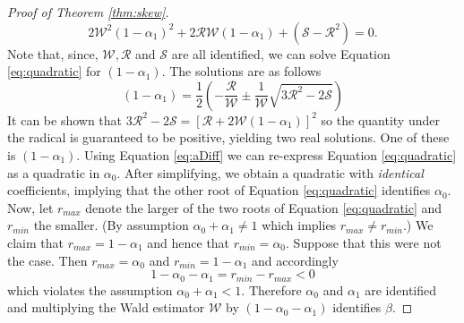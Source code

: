 \begin{proof}[Proof of Theorem \ref{thm:skew}]
  \begin{equation}
    2\mathcal{W}^2 (1-\alpha_1)^2 + 2 \mathcal{R}\mathcal{W} (1-\alpha_1) + (\mathcal{S} -\mathcal{R}^2) = 0.
    \label{eq:quadratic}
  \end{equation}
  Note that, since, $\mathcal{W}, \mathcal{R}$ and $\mathcal{S}$ are all identified, we can solve Equation \ref{eq:quadratic} for $(1-\alpha_1)$.
The solutions are as follows
\begin{equation}
  (1 - \alpha_1) = \frac{1}{2} \left( -\frac{\mathcal{R}}{\mathcal{W}} \pm  \frac{1}{\mathcal{W}}\sqrt{3\mathcal{R}^2 - 2 \mathcal{S}}\right)
  \label{eq:quadsolutions}
\end{equation}
It can be shown that $3\mathcal{R}^2 - 2\mathcal{S} = \left[ \mathcal{R} + 2 \mathcal{W}(1-\alpha_1) \right]^2$ so the quantity under the radical is guaranteed to be positive, yielding two real solutions.
One of these is $(1-\alpha_1)$.
Using Equation \ref{eq:aDiff} we can re-express Equation \ref{eq:quadratic} as a quadratic in $\alpha_0$.
After simplifying, we obtain a quadratic with \emph{identical} coefficients, implying that the other root of Equation \ref{eq:quadratic} identifies $\alpha_0$.
Now, let $r_{max}$ denote the larger of the two roots of Equation \ref{eq:quadratic} and $r_{min}$ the smaller.
(By assumption $\alpha_0 + \alpha_1 \neq 1$ which implies $r_{max} \neq r_{min}$.)
We claim that $r_{max} = 1 - \alpha_1$ and hence that $r_{min} = \alpha_0$.
Suppose that this were not the case.
Then $r_{max} = \alpha_0$ and $r_{min}=1 - \alpha_1$ and accordingly
\[1 - \alpha_0 - \alpha_1 = r_{min} - r_{max} < 0\]
which violates the assumption $\alpha_0 + \alpha_1 < 1$.
Therefore $\alpha_0$ and $\alpha_1$ are identified and multiplying the Wald estimator $\mathcal{W}$ by $(1 - \alpha_0 - \alpha_1)$ identifies $\beta$.
\end{proof}
